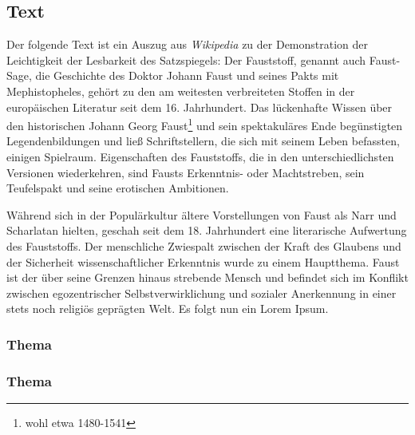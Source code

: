 \subsection{Text}
Der folgende Text ist ein Auszug aus \textit{Wikipedia} zu der Demonstration der Leichtigkeit der Lesbarkeit des Satzspiegels:
Der Fauststoff, genannt auch Faust-Sage, die Geschichte des Doktor Johann Faust und seines Pakts mit Mephistopheles, gehört zu den am weitesten verbreiteten Stoffen in der europäischen Literatur seit dem 16. Jahrhundert. Das lückenhafte Wissen über den historischen Johann Georg Faust\footnote{wohl etwa 1480-1541} und sein spektakuläres Ende begünstigten Legendenbildungen und ließ Schriftstellern, die sich mit seinem Leben befassten, einigen Spielraum. Eigenschaften des Fauststoffs, die in den unterschiedlichsten Versionen wiederkehren, sind Fausts Erkenntnis- oder Machtstreben, sein Teufelspakt und seine erotischen Ambitionen.

Während sich in der Populärkultur ältere Vorstellungen von Faust als Narr und Scharlatan hielten, geschah seit dem 18. Jahrhundert eine literarische Aufwertung des Fauststoffs. Der menschliche Zwiespalt zwischen der Kraft des Glaubens und der Sicherheit wissenschaftlicher Erkenntnis wurde zu einem Hauptthema. Faust ist der über seine Grenzen hinaus strebende Mensch und befindet sich im Konflikt zwischen egozentrischer Selbstverwirklichung und sozialer Anerkennung in einer stets noch religiös geprägten Welt.
Es folgt nun ein Lorem Ipsum.

\lipsum[1]

\subsubsection{Thema}
\lipsum[2-4]
\subsubsection{Thema}
\lipsum[5-7]
